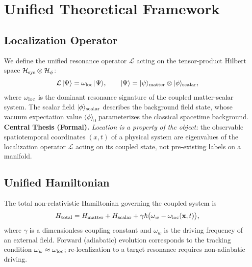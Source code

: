 \documentclass[conference,letterpaper,10pt]{IEEEtran}
\begin{document}
\section{Unified Theoretical Framework}
\subsection{Localization Operator}
We define the unified resonance operator \(\mathcal{L}\) acting on the tensor-product Hilbert space \(\mathcal{H}_{\rm
sys} \otimes \mathcal{H}_\phi\):
\begin{equation}
\mathcal{L}\,|\Psi\rangle = \omega_{\rm loc}\,|\Psi\rangle, \qquad
|\Psi\rangle = |\psi\rangle_{\rm matter} \otimes |\phi\rangle_{\rm scalar},
\label{eq:loc-op}
\end{equation}
where \(\omega_{\rm loc}\) is the dominant resonance signature of the coupled matter-scalar system. The scalar field
\(|\phi\rangle_{\rm scalar}\) describes the background field state, whose vacuum expectation value
\(\langle\phi\rangle_0\) parameterizes the classical spacetime background.
\textbf{Central Thesis (Formal).} \emph{Location is a property of the object:} the observable spatiotemporal
coordinates \((x,t)\) of a physical system are eigenvalues of the localization operator \(\mathcal{L}\) acting on its
coupled state, not pre-existing labels on a manifold.

\subsection{Unified Hamiltonian}
The total non-relativistic Hamiltonian governing the coupled system is
\begin{equation}
H_{\rm total} = H_{\rm matter} + H_{\rm scalar} + \gamma\hbar\bigl(\omega_w - \omega_{\rm loc}(\mathbf{x},t)\bigr),
\label{eq:hamiltonian}
\end{equation}
where \(\gamma\) is a dimensionless coupling constant and \(\omega_w\) is the driving frequency of an external field.
Forward (adiabatic) evolution corresponds to the tracking condition \(\omega_w \approx \omega_{\rm loc}\);
re-localization to a target resonance requires non-adiabatic driving.
\end{document}
